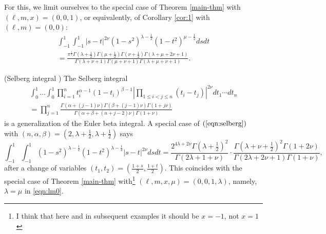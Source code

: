 \documentclass[12pt]{article}
\numberwithin{equation}{section}
\begin{document}
For this, we limit ourselves to the special case of Theorem \ref{main-thm}
with $(\ell, m, x) = (0, 0, 1)$, or equivalently, of Corollary \ref{cor:1}
with $(\ell, m) = (0, 0)$:
\begin{multline}  \label{eqn:lm0}
   \displaystyle\int_{- 1}^1 \displaystyle\int_{- 1}^1 | s - t |^{2 \nu} (1 - s^2)^{\lambda -
  \frac{1}{2}} (1 - t^2)^{\mu - \frac{1}{2}} d s d t \\
  = \frac{\pi^{\frac{1}{2}}
  \Gamma \left( \lambda + \frac{1}{2} \right) \Gamma \left( \mu + \frac{1}{2}
  \right) \Gamma \left( \nu + \frac{1}{2} \right) \Gamma (\lambda + \mu + 2
  \nu + 1)}{\Gamma (\lambda + \nu + 1) \Gamma (\mu + \nu + 1) \Gamma (\lambda
  + \mu + \nu + 1)} .
\end{multline}
\begin{example}
  \label{ex:1}(Selberg integral {\cite{Selberg:411367}}) The Selberg integral
  \begin{multline}
     \displaystyle\int_0^1 \ldots \displaystyle\int_0^1 \displaystyle\prod_{i = 1}^n t_i^{\alpha - 1} (1 -
    t_i)^{\beta - 1} \left| \displaystyle\prod_{1 \leqslant i < j \leqslant n} (t_i - t_j)
    \right|^{2 \nu} d t_1 \cdots d t_n    \\
     = \displaystyle\prod_{j = 1}^n \frac{\Gamma (\alpha + (j - 1) \nu) \Gamma (\beta +
    (j - 1) \nu) \Gamma (1 + j \nu)}{\Gamma (\alpha + \beta + (n + j - 2) \nu)
    \Gamma (1 + \nu)}   
	 \label{eqn:selberg} 
  \end{multline}
  is a generalization of the Euler beta integral. A special case of
  $(\ref{eqn:selberg})$ with $(n, \alpha, \beta) = \left( 2, \lambda +
  \frac{1}{2}, \lambda + \frac{1}{2} \right)$ says
  \begin{equation}
     \displaystyle\int_{- 1}^1 \displaystyle\int_{- 1}^1 (1 -
    s^2)^{\lambda - \frac{1}{2}} (1 - t^2)^{\lambda - \frac{1}{2}} | s - t
    |^{2 \nu} d s d t 
    = \displaystyle\frac{2^{4\lambda+2\nu}\Gamma \left( \lambda + \frac{1}{2} \right)^2}{\Gamma (2
    \lambda + 1 + \nu)} \cdot \frac{\Gamma \left( \lambda + \nu + \frac{1}{2}
    \right)^2 \Gamma (1 + 2 \nu)}{\Gamma (2 \lambda + 2 \nu + 1) \Gamma (1 +
    \nu)},
    \label{eqn:spec_selberg}
  \end{equation}
  after a change of variables $(t_1, t_2) = \left( \frac{1 + s}{2}, \frac{1 +
  t}{2} \right)$. This coincides with the special case of Theorem
  \ref{main-thm} with\footnote{I think that here and in subsequent examples it should be $x
  =-1$, not $x=1$} $(\ell,m,x,\mu)=(0,0,1,\lambda)$, namely, $\lambda=\mu$ in 
  \eqref{eqn:lm0}.
\end{example}
\end{document}
